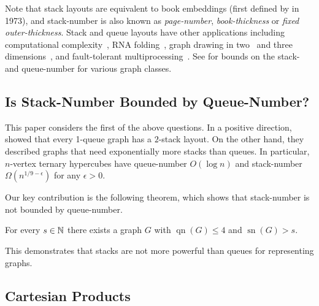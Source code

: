 \documentclass[kpfonts]{patmorin}
\DeclareMathOperator{\sn}{sn}
\DeclareMathOperator{\qn}{qn}
\renewcommand{\le}{\leqslant}
\begin{document}
Note that stack layouts are equivalent to book embeddings (first defined by \citet{Ollmann73} in 1973), and stack-number is also known as \emph{page-number}, \emph{book-thickness} or \emph{fixed outer-thickness}. Stack and queue layouts have other applications including computational complexity~\citep{GKS89,DSW16,Bourgain09,BY13},  RNA folding~\citep{HS99}, graph drawing in two~\citep{BB04,ADFPR12,SSSV-WG94} and three dimensions~\citep{DMW05,Wood-GD01,DMW17,DPW04},
and fault-tolerant multiprocessing~\citep{CLR87,Rosenberg83a,Rosenberg86a,Rosenberg86}.
See \citep{BK79,Blankenship-PhD03,DujWoo04,DujWoo-DCG07,DJMMUW20,DFP13,BFGMMRU19,Yannakakis89,Yann20,MBKPRU20} for bounds on the stack- and queue-number for various graph classes.

\subsection*{Is Stack-Number Bounded by Queue-Number?}

This paper considers the first of the above questions. In a positive direction, \citet{HLR92}  showed that every 1-queue graph has a $2$-stack layout. On the other hand, they described graphs that need exponentially more stacks than queues. In particular, $n$-vertex ternary hypercubes have queue-number $O(\log n)$ and stack-number $\Omega(n^{1/9-\epsilon})$ for any $\epsilon>0$.

Our key contribution is the following theorem, which shows that stack-number is not bounded by queue-number.

\begin{thm}\label{family}
	For every $s\in \mathbb{N}$ there exists a graph $G$ with $\qn(G)\le 4$ and $\sn(G)>s$.
\end{thm}

This demonstrates that stacks are not more powerful than queues for representing graphs.

\subsection*{Cartesian Products}
\end{document}
